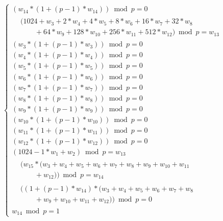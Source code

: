 \vspace{5pt}
\begin{equation}
\label{eq:comparison_gadget}
\begin{cases}
(w_{14} * (1 + (p - 1) * w_{14})) \bmod p = 0 \\
\begin{aligned}
&(1024 + w_{3} + 2 * w_{4} + 4 * w_{5} + 8 * w_{6} + 16 * w_{7} + 32 * w_{8} \\
&\quad\quad + 64 * w_{9} + 128 * w_{10} + 256 * w_{11} + 512 * w_{12}) \bmod p = w_{13}
\end{aligned} \\
(w_{3} * (1 + (p - 1) * w_{3})) \bmod p = 0 \\
(w_{4} * (1 + (p - 1) * w_{4})) \bmod p = 0 \\
(w_{5} * (1 + (p - 1) * w_{5})) \bmod p = 0 \\
(w_{6} * (1 + (p - 1) * w_{6})) \bmod p = 0 \\
(w_{7} * (1 + (p - 1) * w_{7})) \bmod p = 0 \\
(w_{8} * (1 + (p - 1) * w_{8})) \bmod p = 0 \\
(w_{9} * (1 + (p - 1) * w_{9})) \bmod p = 0 \\
(w_{10} * (1 + (p - 1) * w_{10})) \bmod p = 0 \\
(w_{11} * (1 + (p - 1) * w_{11})) \bmod p = 0 \\
(w_{12} * (1 + (p - 1) * w_{12})) \bmod p = 0 \\
(1024 - 1 * w_{1} + w_{2}) \bmod p = w_{13} \\
\begin{aligned}
&(w_{15} * (w_{3} + w_{4} + w_{5} + w_{6} + w_{7} + w_{8} + w_{9} + w_{10} + w_{11} \\
&\quad\quad + w_{12})) \bmod p = w_{14}
\end{aligned} \\
\begin{aligned}
&((1 + (p - 1) * w_{14}) * (w_{3} + w_{4} + w_{5} + w_{6} + w_{7} + w_{8} \\
&\quad\quad + w_{9} + w_{10} + w_{11} + w_{12})) \bmod p = 0
\end{aligned} \\
w_{14} \bmod p = 1
\end{cases}
\end{equation}
\vspace{5pt}

